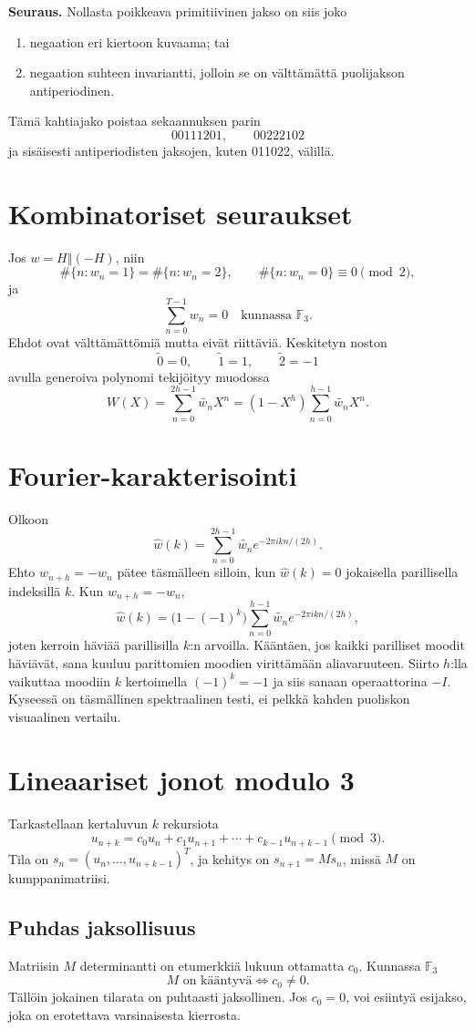\documentclass[11pt,a4paper]{article}
\newcommand{\F}{\mathbb{F}}
\newcommand{\oplusword}{\mathbin{\Vert}}
\newcommand{\centerlift}[1]{\widetilde{#1}}
\begin{document}
\textbf{Seuraus.} Nollasta poikkeava primitiivinen jakso on siis joko
\begin{enumerate}
\item negaation eri kiertoon kuvaama; tai
\item negaation suhteen invariantti, jolloin se on välttämättä puolijakson antiperiodinen.
\end{enumerate}
Tämä kahtiajako poistaa sekaannuksen parin
\[
00111201,\qquad 00222102
\]
ja sisäisesti antiperiodisten jaksojen, kuten 011022, välillä.

\section{Kombinatoriset seuraukset}
Jos $w=H\oplusword(-H)$, niin
\[
\#\{n:w_n=1\}=\#\{n:w_n=2\},\qquad \#\{n:w_n=0\}\equiv0\pmod2,
\]
ja
\[
\sum_{n=0}^{T-1}w_n=0\quad\text{kunnassa }\F_3.
\]
Ehdot ovat välttämättömiä mutta eivät riittäviä. Keskitetyn noston
\[
\centerlift0=0,\qquad \centerlift1=1,\qquad \centerlift2=-1
\]
avulla generoiva polynomi tekijöityy muodossa
\[
W(X)=\sum_{n=0}^{2h-1}\centerlift{w_n}X^n=(1-X^h)\sum_{n=0}^{h-1}\centerlift{w_n}X^n.
\]

\clearpage
\section{Fourier-karakterisointi}
Olkoon
\[
\widehat w(k)=\sum_{n=0}^{2h-1}\centerlift{w_n}e^{-2\pi i kn/(2h)}.
\]
Ehto $w_{n+h}=-w_n$ pätee täsmälleen silloin, kun $\widehat w(k)=0$ jokaisella parillisella indeksillä $k$. Kun $w_{n+h}=-w_n$,
\[
\widehat w(k)=\bigl(1-(-1)^k\bigr)\sum_{n=0}^{h-1}\centerlift{w_n}e^{-2\pi i kn/(2h)},
\]
joten kerroin häviää parillisilla $k$:n arvoilla. Kääntäen, jos kaikki parilliset moodit häviävät, sana kuuluu parittomien moodien virittämään aliavaruuteen. Siirto $h$:lla vaikuttaa moodiin $k$ kertoimella $(-1)^k=-1$ ja siis sanaan operaattorina $-I$. Kyseessä on täsmällinen spektraalinen testi, ei pelkkä kahden puoliskon visuaalinen vertailu.

\section{Lineaariset jonot modulo 3}
Tarkastellaan kertaluvun $k$ rekursiota
\[
u_{n+k}=c_0u_n+c_1u_{n+1}+\cdots+c_{k-1}u_{n+k-1}\pmod3.
\]
Tila on $s_n=(u_n,\ldots,u_{n+k-1})^T$, ja kehitys on $s_{n+1}=Ms_n$, missä $M$ on kumppanimatriisi.

\subsection{Puhdas jaksollisuus}
Matriisin $M$ determinantti on etumerkkiä lukuun ottamatta $c_0$. Kunnassa $\F_3$
\[
M\text{ on kääntyvä}\iff c_0\neq0.
\]
Tällöin jokainen tilarata on puhtaasti jaksollinen. Jos $c_0=0$, voi esiintyä esijakso, joka on erotettava varsinaisesta kierrosta.
\end{document}
